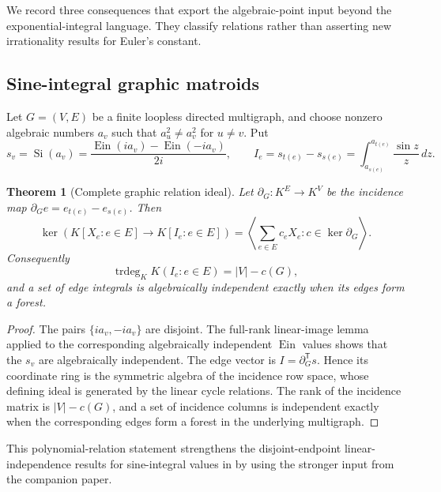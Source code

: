 \documentclass[11pt]{article}
\newtheorem{theorem}{Theorem}[section]
\theoremstyle{definition}
\theoremstyle{remark}
\newcommand{\Ein}{\operatorname{Ein}}
\newcommand{\trdeg}{\operatorname{trdeg}}
\begin{document}
We record three consequences that export the algebraic-point input beyond
the exponential-integral language.  They classify relations rather than
asserting new irrationality results for Euler's constant.

\subsection*{Sine-integral graphic matroids}

Let \(G=(V,E)\) be a finite loopless directed multigraph, and choose nonzero algebraic numbers
\(a_v\) such that \(a_u^2\ne a_v^2\) for \(u\ne v\).  Put
\[
 s_v=\operatorname{Si}(a_v)
 =\frac{\Ein(ia_v)-\Ein(-ia_v)}{2i},
 \qquad
 I_e=s_{t(e)}-s_{s(e)}
 =\int_{a_{s(e)}}^{a_{t(e)}}\frac{\sin z}{z}\,dz.
\]

\begin{theorem}[Complete graphic relation ideal]
\label{thm:sine-graphic-ideal}
Let \(\partial_G:K^E\to K^V\) be the incidence map
\(\partial_Ge=e_{t(e)}-e_{s(e)}\).  Then
\begin{equation}\label{eq:sine-graphic-ideal}
 \boxed{\displaystyle
 \ker\!\left(K[X_e:e\in E]\longrightarrow K[I_e:e\in E]\right)
 =
 \left\langle\sum_{e\in E}c_eX_e:
 c\in\ker\partial_G\right\rangle.}
\end{equation}
Consequently
\begin{equation}\label{eq:sine-graphic-trdeg}
 \trdeg_KK(I_e:e\in E)=|V|-c(G),
\end{equation}
and a set of edge integrals is algebraically independent exactly when its
edges form a forest.
\end{theorem}

\begin{proof}
The pairs \(\{ia_v,-ia_v\}\) are disjoint.  The full-rank linear-image
lemma applied to the corresponding algebraically independent \(\Ein\)
values shows that the \(s_v\) are algebraically independent.  The edge
vector is \(I=\partial_G^{\mathsf T}s\).  Hence its coordinate ring is
the symmetric algebra of the incidence row space, whose defining ideal is
generated by the linear cycle relations.  The rank of the incidence matrix
is \(|V|-c(G)\), and a set of incidence columns is independent exactly when
the corresponding edges form a forest in the underlying multigraph.
\end{proof}

This polynomial-relation statement strengthens the disjoint-endpoint
linear-independence results for sine-integral values in
\cite{Delaygue2022} by using the stronger input from the companion paper.
\end{document}
